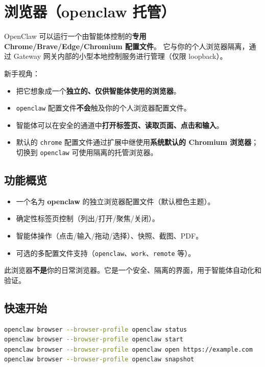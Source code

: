 \clearpage

\section{浏览器（openclaw 托管）}


OpenClaw 可以运行一个由智能体控制的\textbf{专用 Chrome/Brave/Edge/Chromium 配置文件}。
它与你的个人浏览器隔离，通过 Gateway 网关内部的小型本地控制服务进行管理（仅限 loopback）。

新手视角：

\begin{itemize}
  \item 把它想象成一个\textbf{独立的、仅供智能体使用的浏览器}。
  \item \texttt{openclaw} 配置文件\textbf{不会}触及你的个人浏览器配置文件。
  \item 智能体可以在安全的通道中\textbf{打开标签页、读取页面、点击和输入}。
  \item 默认的 \texttt{chrome} 配置文件通过扩展中继使用\textbf{系统默认的 Chromium 浏览器}；切换到 \texttt{openclaw} 可使用隔离的托管浏览器。
\end{itemize}


\subsection{功能概览}


\begin{itemize}
  \item 一个名为 \textbf{openclaw} 的独立浏览器配置文件（默认橙色主题）。
  \item 确定性标签页控制（列出/打开/聚焦/关闭）。
  \item 智能体操作（点击/输入/拖动/选择）、快照、截图、PDF。
  \item 可选的多配置文件支持（\texttt{openclaw}、\texttt{work}、\texttt{remote} 等）。
\end{itemize}


此浏览器\textbf{不是}你的日常浏览器。它是一个安全、隔离的界面，用于智能体自动化和验证。

\subsection{快速开始}


\begin{lstlisting}[language=bash]
openclaw browser --browser-profile openclaw status
openclaw browser --browser-profile openclaw start
openclaw browser --browser-profile openclaw open https://example.com
openclaw browser --browser-profile openclaw snapshot
\end{lstlisting}


